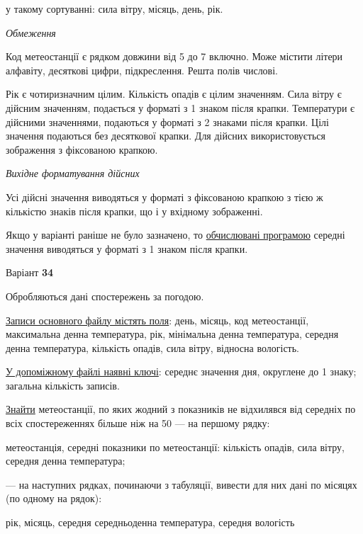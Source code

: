 \documentclass[11pt, ukrainian]{article}
\begin{document}
{\noindent}у такому сортуванні: сила вітру, місяць, день, рік.


\bigskip\textit{Обмеження}

Код метеостанції є рядком довжини від 5 до 7 включно.
Може містити літери алфавіту, десяткові цифри, підкреслення. Решта полів числові.

Рік є чотиризначним цілим.
Кількість опадів є цілим значенням.
Сила вітру є дійсним значенням, подається у форматі з 1 знаком після крапки.
Температури є дійсними значеннями, подаються у форматі з 2 знаками після крапки.
Цілі значення подаються без десяткової крапки.
Для дійсних використовується зображення з фіксованою крапкою.

\textit{Вихідне форматування дійсних}

Усі дійсні значення виводяться у форматі з фіксованою крапкою з тією ж кількістю знаків після крапки, що і у вхідному зображенні.

Якщо у варіанті раніше не було зазначено, то \underline{обчислювані програмою} середні значення виводяться у форматі з 1 знаком після крапки.


\par
\newpage
{\center Варіант  \No \textbf { 34 }\par}
\bigskip
Обробляються дані спостережень за погодою. 

\underline{Записи основного файлу містять поля}: день, місяць, код метеостанції, максимальна денна температура, рік, мінімальна денна температура, середня денна температура, кількість опадів, сила вітру, відносна вологість.

\underline{У допоміжному файлі наявні ключі}: середнє значення дня, округлене до 1 знаку; загальна кількість записів.

\underline{Знайти} метеостанції, по яких жодний з показників не відхилявся від середніх по всіх спостереженнях більше ніж на 50%
{\noindent}--- на першому рядку:\par
метеостанція, середні показники по метеостанції: кількість опадів, сила вітру, середня денна температура;

{\noindent}--- на наступних рядках, починаючи з табуляції, вивести для них дані по місяцях (по одному на рядок):\par
рік, місяць, середня середньоденна температура, середня вологість
\end{document}
